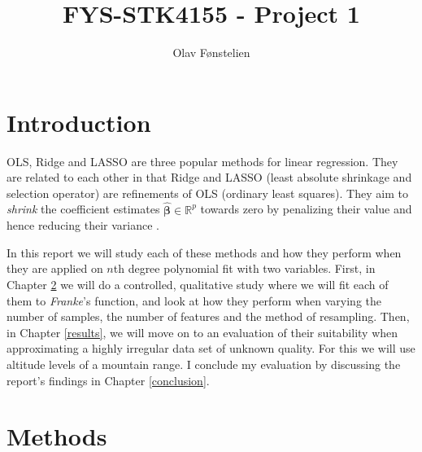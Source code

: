 \documentclass[]{article}
\title{FYS-STK4155 - Project 1}
\author{Olav Fønstelien}
\begin{document}
\maketitle

\begin{abstract}

\end{abstract}

\section{Introduction} \label{intro}
OLS, Ridge and LASSO are three popular methods for linear regression. They are related to each other in that Ridge and LASSO (least absolute shrinkage and selection operator) are refinements of OLS (ordinary least squares). They aim to \textit{shrink} the coefficient estimates $\mathbf{\hat{\beta}} \in \mathbb{R}^p$ towards zero by penalizing their value and hence reducing their variance \cite{james2013introduction}.

In this report we will study each of these methods and how they perform when they are applied on $n$th degree polynomial fit with two variables. First, in Chapter \ref{methods} we will do a controlled, qualitative study where we will fit each of them to \textit{Franke}'s function, and look at how they perform when varying the number of samples, the number of features and the method of resampling. Then, in Chapter \ref{results}, we will move on to an evaluation of their suitability when approximating a highly irregular data set of unknown quality. For this we will use altitude levels of a mountain range. I conclude my evaluation by discussing the report's findings in Chapter \ref{conclusion}.

\section{Methods} \label{methods}
\end{document}
